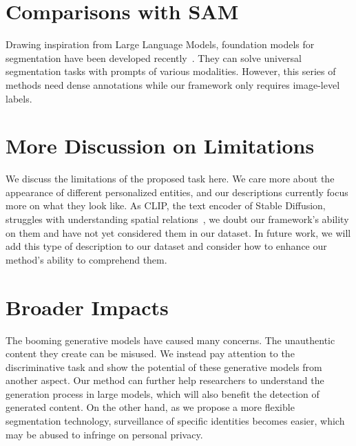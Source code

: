 \documentclass[letterpaper]{article} \usepackage[submission]{aaai24}  \usepackage{times}  \usepackage{helvet}  \usepackage{courier}  \usepackage[hyphens]{url}  \usepackage{graphicx} \urlstyle{rm} \def\UrlFont{\rm}  \usepackage{natbib}  \usepackage{caption} \frenchspacing  \setlength{\pdfpagewidth}{8.5in} \setlength{\pdfpageheight}{11in} \usepackage{algorithm}
\begin{document}
\section{Comparisons with SAM}
\label{sec:sam}

Drawing inspiration from Large Language Models, foundation models for segmentation have been developed recently~\cite{SAM, SEEM}.
They can solve universal segmentation tasks with prompts of various modalities.
However, this series of methods need dense annotations while our framework only requires image-level labels.

\section{More Discussion on Limitations}
\label{sec:dataset limitation}

We discuss the limitations of the proposed task here.
We care more about the appearance of different personalized entities, and our descriptions currently focus more on what they look like.
As CLIP, the text encoder of Stable Diffusion, struggles with understanding spatial relations~\cite{composerelation}, we doubt our framework's ability on them and have not yet considered them in our dataset.
In future work, we will add this type of description to our dataset and consider how to enhance our method's ability to comprehend them.

\section{Broader Impacts}
\label{sec:impacts}

The booming generative models have caused many concerns.
The unauthentic content they create can be misused.
We instead pay attention to the discriminative task and show the potential of these generative models from another aspect.
Our method can further help researchers to understand the generation process in large models, which will also benefit the detection of generated content.
On the other hand, as we propose a more flexible segmentation technology, surveillance of specific identities becomes easier, which may be abused to infringe on personal privacy.






\end{document}
